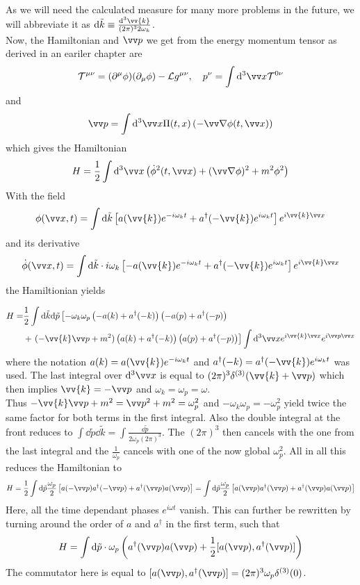 As we will need the calculated measure for many more problems in the future, we will abbreviate it as $\dd \tilde{k} \equiv \frac{\dd^3 \vv{k}}{(2\pi)^3 2 \omega_k}$.\\
Now, the Hamiltonian and $\vp$ we get from the energy momentum tensor as derived in an eariler chapter are
\[ \mathcal{T}^{\mu\nu} = ( \p^\mu \phi)(\p_\mu \phi) - \LL g^{\mu\nu}, ~~~p^\nu = \int \dd^3 \vx \mathcal{T}^{0\nu}\]
and
\[ \vp = \int \dd^3 \vx \Pi(t,x)\left(-\vn \phi(t,\vx)\right)\]
which gives the Hamiltonian
\[ H = \frac{1}{2} \int \dd^3 \vx \left( \dot{\phi}^2(t,\vx) + ( \vn \phi)^2 + m^2 \phi^2\right)\]
With the field
\[ \phi(\vx, t) = \int \dd \tilde{k} \left[ a (\vv{k}) e^{-i \omega_k t} + a^\dagger(-\vv{k}) e^{i \omega_k t} \right] e^{i \vv{k}\vx}\]
and its derivative
\[ \dot{\phi}(\vx, t) = \int \dd \tilde{k}\cc i \omega_k \left[ -a(\vv{k}) e^{-i \omega_k t} + a^\dagger (-\vv{k}) e^{i \omega_k t} \right] e^{i \vv{k}\vx}\]
the Hamiltionian yields

\begin{align*}
H =& \frac{1}{2} \int \dd \tilde{k} \dd \tilde{p} \left[ - \omega_k \omega_p \left( - a(k) + a^\dagger(-k) \right)\left( -a(p) + a^\dagger(-p)\right) \right. \\
&+ \left. ( - \vv{k} \vp + m^2) \left( a(k) + a^\dagger(-k) \right) \left( a(p) + a^\dagger(-p)\right)\right] \int \dd^3 \vx e^{i \vv{k} \vx}e^{i \vp \vx}
\end{align*}
where the notation $a(k) = a(\vv{k})e^{-i\omega_kt}$ and $a^\dagger(-k) = a^\dagger(-\vv{k})e^{i\omega_kt}$ was used. The last integral over $\dd^3 \vx$ is equal to $(2\pi)^3 \delta^{(3)}(\vv{k} + \vp)$ which then implies $\vv{k} = - \vp$ and $\omega_k = \omega_p = \omega$.\\
Thus $-\vv{k}\vp + m^2 =  \vp^2 + m^2 = \omega_p^2$ and $-\omega_k \omega_p = -\omega_p^2$ yield twice the same factor for both terms in the first integral. Also the double integral at the front reduces to $\int \dd\tilde{p}\dd\tilde{k} = \int \frac{\dd\tilde{p}}{2 \omega_p (2\pi)^3}$. The $(2\pi)^3$ then cancels with the one from the last integral and the $\frac{1}{\omega_p}$ cancels with one of the now global $\omega_p^2$. All in all this reduces the Hamiltonian to
\[H = \frac{1}{2} \int \dd\tilde{p} \frac{\omega_p}{2} \left[ a(-\vp)a^\dagger(-\vp) + a^\dagger(\vp)a(\vp)\right] = \int \dd \tilde{p} \frac{\omega_p}{2} \left[a(\vp) a^\dagger(\vp) + a^\dagger(\vp) a(\vp) \right]\]
Here, all the time dependant phases $e^{i\omega t}$ vanish. This can further be rewritten by turning around the order of $a$ and $a^\dagger$ in the first term, such that
\[H = \int \dd \tilde{p} \cc\omega_p \left( a^\dagger(\vp) a(\vp) + \frac{1}{2}[ a(\vp), a^\dagger(\vp) ] \right)\]
The commutator here is equal to $[a(\vp), a^\dagger(\vp)] = (2\pi)^3 \omega_p \delta^{(3)}(0)$.
